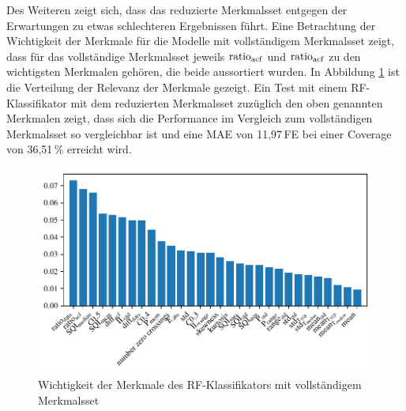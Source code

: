 Des Weiteren zeigt sich, dass das reduzierte Merkmalsset entgegen der Erwartungen zu etwas schlechteren Ergebnissen führt. Eine Betrachtung der Wichtigkeit der Merkmale für die Modelle mit vollständigem Merkmalsset zeigt, dass für das vollständige Merkmalsset jeweils $\text{ratio}\textsubscript{acf}$ und $\text{ratio}\textsubscript{acf}$ zu den wichtigsten Merkmalen gehören, die beide aussortiert wurden. In Abbildung \ref{fig:rf-clf-all-importances} ist die Verteilung der Relevanz der Merkmale gezeigt. Ein Test mit einem \ac{RF}-Klassifikator mit dem reduzierten Merkmalsset zuzüglich den oben genannten Merkmalen zeigt, dass sich die Performance im Vergleich zum vollständigen Merkmalsset so vergleichbar ist und eine \ac{MAE} von 11,97\,\si{FE} bei einer Coverage von 36,51\,\% erreicht wird.
\begin{figure}[H]
	\centering
	\includegraphics{pic/rf-clf-all-importances.pdf}
 	\caption{Wichtigkeit der Merkmale des \ac{RF}-Klassifikators mit vollständigem Merkmalsset}
 	\label{fig:rf-clf-all-importances}
\end{figure}

